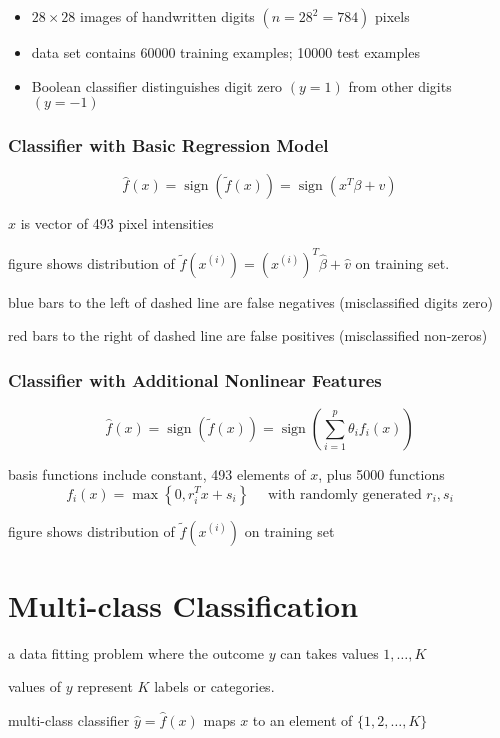 \begin{itemize}
    \item $ 28 \times 28 $ images of handwritten digits $ \left(n=28^{2}=784\right) $ pixels
    \item data set contains 60000 training examples; 10000 test examples
    \item Boolean classifier distinguishes digit zero $ (y=1) $ from other digits $ (y=-1) $

    
\end{itemize}


\subsubsection{Classifier with Basic Regression Model}

$$
\hat{f}(x)=\operatorname{sign}(\tilde{f}(x))=\operatorname{sign}\left(x^{T} \beta+v\right)
$$

$ x $ is vector of 493 pixel intensities

figure shows distribution of $ \tilde{f}\left(x^{(i)}\right)=\left(x^{(i)}\right)^{T} \hat{\beta}+\hat{v} $ on training set.

blue bars to the left of dashed line are false negatives (misclassified digits zero)

red bars to the right of dashed line are false positives (misclassified non-zeros)

\subsubsection{Classifier with Additional Nonlinear Features}

$$
\hat{f}(x)=\operatorname{sign}(\tilde{f}(x))=\operatorname{sign}\left(\sum_{i=1}^{p} \theta_{i} f_{i}(x)\right)
$$

basis functions include constant, 493 elements of $ x $, plus 5000 functions
$$
f_{i}(x)=\max \left\{0, r_{i}^{T} x+s_{i}\right\} \quad \text { with randomly generated } r_{i}, s_{i}
$$

figure shows distribution of $ \tilde{f}\left(x^{(i)}\right) $ on training set

\section{Multi-class Classification}

\begin{problem}
    a data fitting problem where the outcome $ y $ can takes values $ 1, \ldots, K $

    values of $ y $ represent $ K $ labels or categories.

    multi-class classifier $ \hat{y}=\hat{f}(x) $ maps $ x $ to an element of $ \{1,2, \ldots, K\} $
\end{problem}

